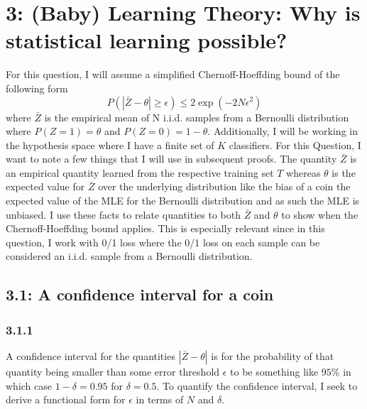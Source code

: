 \documentclass[12pt]{amsart}
\begin{document}
\section*{3: (Baby) Learning Theory: Why is statistical learning possible?}

For this question, I will assume a simplified Chernoff-Hoeffding bound of the following form
\begin{equation} \label{eqn:ch_bound}
P(|\bar{Z} - \theta| \geq \epsilon) \leq 2 \exp(-2N \epsilon^2)
\end{equation}
where $\bar{Z}$ is the empirical mean of N i.i.d. samples from a Bernoulli distribution where $P(Z = 1) = \theta$ and $P(Z = 0) = 1 - \theta$.  Additionally, I will be working in the hypothesis space where I have a finite set of $K$ classifiers.  For this Question, I want to note a few things that I will use in subsequent proofs.  The quantity $\bar{Z}$ is an empirical quantity learned from the respective training set $T$ whereas $\theta$ is the expected value for $\bar{Z}$ over the underlying distribution like the bias of a coin the expected value of the MLE for the Bernoulli distribution and as such the MLE is unbiased.  I use these facts to relate quantities to both $\bar{Z}$ and $\theta$ to show when the Chernoff-Hoeffding bound applies.  This is especially relevant since in this question, I work with 0/1 loss where the 0/1 loss on each sample can be considered an i.i.d. sample from a Bernoulli distribution.

\subsection*{3.1: A confidence interval for a coin}

\subsubsection*{3.1.1}

A confidence interval for the quantities $|\bar{Z} - \theta|$ is for the probability of that quantity being smaller than some error threshold $\epsilon$ to be something like $95\%$ in which case $1 - \delta = 0.95$ for $\delta = 0.5$.  To quantify the confidence interval, I seek to derive a functional form for $\epsilon$ in terms of $N$ and $\delta$.
\end{document}
